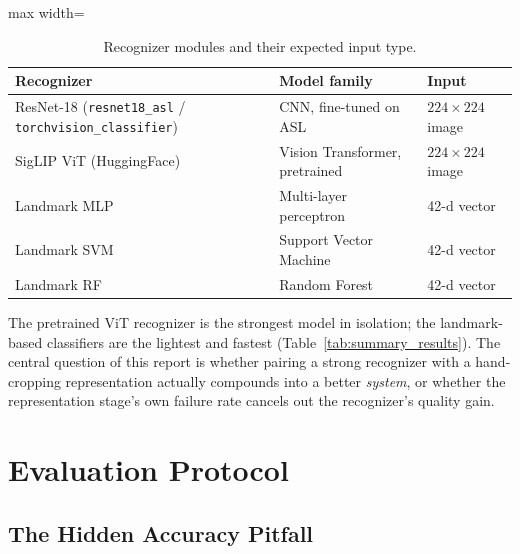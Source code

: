 \documentclass[11pt,a4paper]{article}
\newcommand{\codepath}[1]{\texttt{\small #1}}
\begin{document}
\begin{table}[H]
\centering
\caption{Recognizer modules and their expected input type.}
\label{tab:recognizers}
\small
\begin{adjustbox}{max width=\textwidth}
\begin{tabular}{lll}
\toprule
\rowcolor{headerblue}
Recognizer & Model family & Input \\
\midrule
ResNet-18 (\codepath{resnet18\_asl} / \codepath{torchvision\_classifier}) & CNN, fine-tuned on ASL & $224\times224$ image \\
SigLIP ViT (HuggingFace) & Vision Transformer, pretrained & $224\times224$ image \\
Landmark MLP & Multi-layer perceptron & 42-d vector \\
Landmark SVM & Support Vector Machine & 42-d vector \\
Landmark RF & Random Forest & 42-d vector \\
\bottomrule
\end{tabular}
\end{adjustbox}
\end{table}

The pretrained ViT recognizer is the strongest model in isolation; the
landmark-based classifiers are the lightest and fastest (Table~\ref{tab:summary_results}).
The central question of this report is whether pairing a strong recognizer
with a hand-cropping representation actually compounds into a better
\emph{system}, or whether the representation stage's own failure rate
cancels out the recognizer's quality gain.

\section{Evaluation Protocol}
\label{sec:metrics}

\subsection{The Hidden Accuracy Pitfall}
\end{document}
